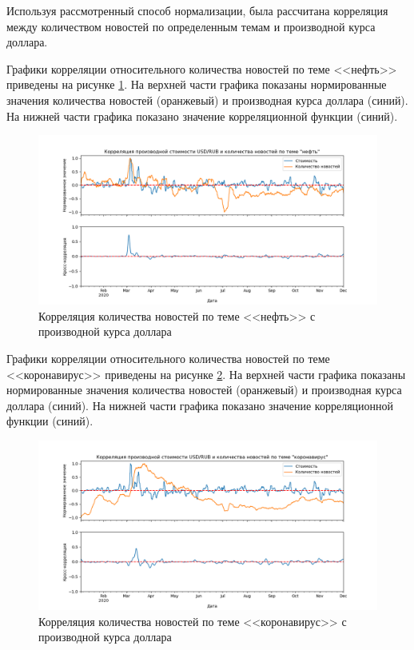 Используя рассмотренный способ нормализации, была рассчитана корреляция между количеством новостей по определенным темам и производной курса доллара.

Графики корреляции относительного количества новостей по теме <<нефть>> приведены на рисунке \ref{img:correlation-derrivative-oil}. На верхней части графика показаны нормированные значения количества новостей (оранжевый) и производная курса доллара (синий). На нижней части графика показано значение корреляционной функции (синий).

\begin{figure}[h!]
    \centering
    \includegraphics[width=\linewidth]{images/correlations/derivative/нефть.png}
    \caption{Корреляция количества новостей по теме <<нефть>> с производной курса доллара}
    \label{img:correlation-derrivative-oil}
\end{figure}

Графики корреляции относительного количества новостей по теме <<коронавирус>> приведены на рисунке \ref{img:correlation-derrivative-covid}. На верхней части графика показаны нормированные значения количества новостей (оранжевый) и производная курса доллара (синий). На нижней части графика показано значение корреляционной функции (синий).

\begin{figure}[h!]
    \centering
    \includegraphics[width=\linewidth]{images/correlations/derivative/коронавирус.png}
    \caption{Корреляция количества новостей по теме <<коронавирус>> с производной курса доллара}
    \label{img:correlation-derrivative-covid}
\end{figure}

